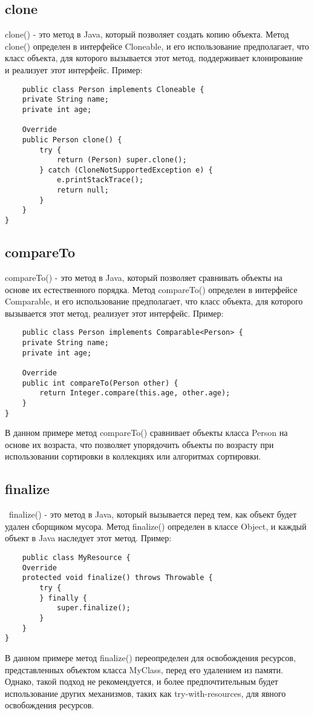 \subsection{clone}
clone() - это метод в Java, который позволяет создать копию объекта. Метод clone() определен в интерфейсе Cloneable, и его использование предполагает, что класс объекта, для которого вызывается этот метод, поддерживает клонирование и реализует этот интерфейс.
Пример:
\begin{lstlisting}
    public class Person implements Cloneable {
    private String name;
    private int age;

    Override
    public Person clone() {
        try {
            return (Person) super.clone();
        } catch (CloneNotSupportedException e) {
            e.printStackTrace();
            return null;
        }
    }
}
\end{lstlisting}
\subsection{compareTo}
compareTo() - это метод в Java, который позволяет сравнивать объекты на основе их естественного порядка. Метод compareTo() определен в интерфейсе Comparable, и его использование предполагает, что класс объекта, для которого вызывается этот метод, реализует этот интерфейс.
Пример:
\begin{lstlisting}
    public class Person implements Comparable<Person> {
    private String name;
    private int age;

    Override
    public int compareTo(Person other) {
        return Integer.compare(this.age, other.age);
    }
}
\end{lstlisting}
В данном примере метод compareTo() сравнивает объекты класса Person на основе их возраста, что позволяет упорядочить объекты по возрасту при использовании сортировки в коллекциях или алгоритмах сортировки.
\subsection{finalize}\
finalize() - это метод в Java, который вызывается перед тем, как объект будет удален сборщиком мусора. Метод finalize() определен в классе Object, и каждый объект в Java наследует этот метод.
Пример:
\begin{lstlisting}
    public class MyResource {
    Override
    protected void finalize() throws Throwable {
        try {
        } finally {
            super.finalize();
        }
    }
}
\end{lstlisting}
В данном примере метод finalize() переопределен для освобождения ресурсов, представленных объектом класса MyClass, перед его удалением из памяти. Однако, такой подход не рекомендуется, и более предпочтительным будет использование других механизмов, таких как try-with-resources, для явного освобождения ресурсов.
